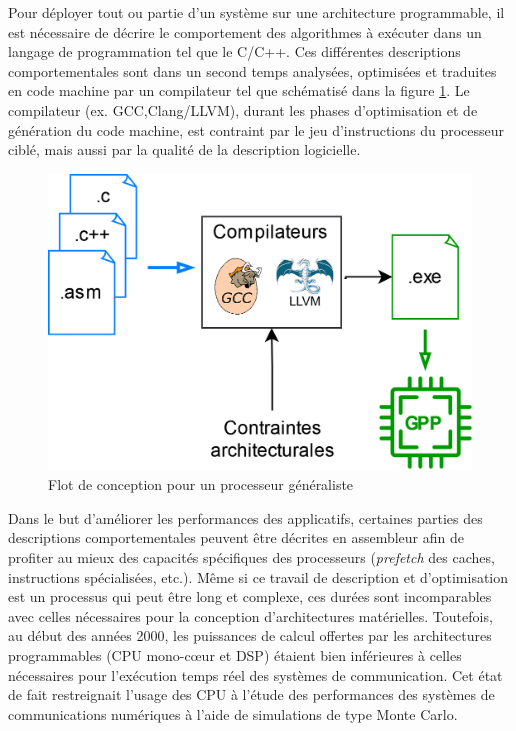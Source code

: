 \documentclass[../main.tex]{subfiles}
\begin{document}
Pour déployer tout ou partie d’un système sur une architecture programmable, il est nécessaire de décrire le comportement des algorithmes à exécuter dans un langage de programmation tel que le C/C++. Ces différentes descriptions comportementales sont dans un second temps analysées, optimisées et traduites en code machine par un compilateur tel que schématisé dans la figure \ref{methodo_GPP}. Le compilateur (ex. GCC,Clang/LLVM), durant les phases d’optimisation et de génération du code machine, est contraint par le jeu d’instructions du processeur ciblé, mais aussi par la qualité de la description logicielle.
\begin{figure}[tb]
    \centering
    \includegraphics[scale=0.20]{figs/methodo_gpp.png}
    \caption{Flot de conception pour un processeur généraliste}
    \label{methodo_GPP}
\end{figure}
Dans le but d’améliorer les performances des applicatifs, certaines parties des descriptions comportementales peuvent être décrites en assembleur afin de profiter au mieux des capacités spécifiques des processeurs (\textit{prefetch} des caches, instructions spécialisées, etc.). Même si ce travail de description et d’optimisation est un processus qui peut être long et complexe, ces durées sont incomparables avec celles nécessaires pour la conception d’architectures matérielles.
Toutefois, au début des années 2000, les puissances de calcul offertes par les architectures programmables (CPU mono-cœur et DSP) étaient bien inférieures à celles nécessaires pour l’exécution temps réel des systèmes de communication. Cet état de fait restreignait l'usage des CPU à l’étude des performances des systèmes de communications numériques à l’aide de simulations de type Monte Carlo.
\end{document}
